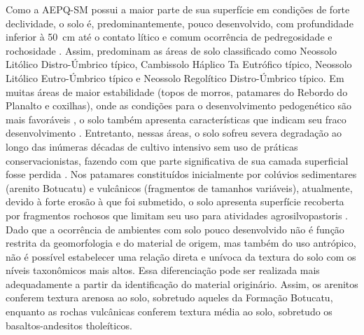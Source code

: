 
Como a AEPQ-SM possui a maior parte de sua superfície em condições de forte declividade, o solo é, 
predominantemente, pouco desenvolvido, com profundidade inferior à \SI{50}{\centi\metre} até o 
contato lítico e comum ocorrência de pedregosidade e rochosidade \cite{Miguel2010}. Assim, 
predominam as áreas de solo classificado como Neossolo Litólico Distro-Úmbrico típico, Cambissolo 
Háplico Ta Eutrófico típico, Neossolo Litólico Eutro-Úmbrico típico e Neossolo Regolítico 
Distro-Úmbrico típico. Em muitas áreas de maior estabilidade (topos de morros, patamares do Rebordo 
do Planalto e coxilhas), onde as condições para o desenvolvimento pedogenético são mais favoráveis 
\cite{Moser1990}, o solo também apresenta características que indicam seu fraco desenvolvimento 
\cite{MouraBueno2012}. Entretanto, nessas áreas, o solo sofreu severa degradação ao longo das 
inúmeras décadas de cultivo intensivo sem uso de práticas conservacionistas, fazendo com que parte 
significativa de sua camada superficial fosse perdida \cite{SamuelRosaEtAl2011a}. Nos patamares 
constituídos inicialmente por colúvios sedimentares (arenito Botucatu) e vulcânicos (fragmentos de 
tamanhos variáveis), atualmente, devido à forte erosão à que foi submetido, o solo apresenta 
superfície recoberta por fragmentos rochosos que limitam seu uso para atividades agrosilvopastoris 
\cite{MouraBueno2012}. Dado que a ocorrência de ambientes com solo pouco desenvolvido não é função 
restrita da geomorfologia e do material de origem, mas também do uso antrópico, não é possível 
estabelecer uma relação direta e unívoca da textura do solo com os níveis taxonômicos mais altos. 
Essa diferenciação pode ser realizada mais adequadamente a partir da identificação do material 
originário. Assim, os arenitos conferem textura arenosa ao solo, sobretudo aqueles da Formação 
Botucatu, enquanto as rochas vulcânicas conferem textura média ao solo, sobretudo os 
basaltos-andesitos tholeíticos.

